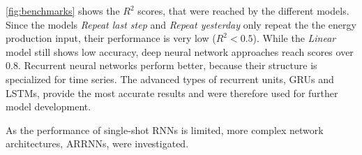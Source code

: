 \documentclass[11pt,table]{article}
\begin{document}
\autoref{fig:benchmarks} shows the $R^2$ scores, that were reached by the different models. Since the models \textit{Repeat last step} and \textit{Repeat yesterday} only repeat the the energy production input, their performance is very low ($R^2 < 0.5$). While the \textit{Linear} model still shows low accuracy, deep neural network approaches reach scores over 0.8. Recurrent neural networks perform better, because their structure is specialized for time series. The advanced types of recurrent units, \acp{GRU} and \acp{LSTM}, provide the most accurate results and were therefore used for further model development.

As the performance of single-shot \acp{RNN} is limited, more complex network architectures, \acp{ARRNN}, were investigated.


\end{document}
